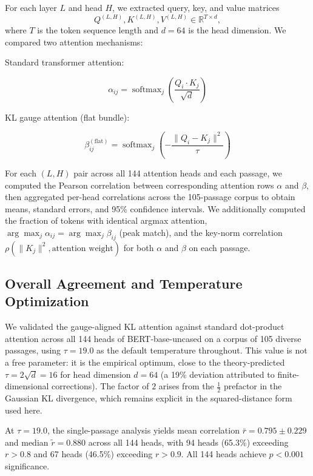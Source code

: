 \documentclass[twoside,11pt]{article}
\begin{document}
For each layer $L$ and head $H$, we extracted query, key, and value matrices
\[
Q^{(L,H)}, K^{(L,H)}, V^{(L,H)} \in \mathbb{R}^{T \times d},
\]
where $T$ is the token sequence length and $d = 64$ is the head dimension. We compared two attention mechanisms:

Standard transformer attention:

\begin{equation}
\alpha_{ij} = \operatorname{softmax}_j \left( \frac{Q_i \cdot K_j}{\sqrt{d}} \right)
\end{equation}

KL gauge attention (flat bundle):

\begin{equation}
\beta^{(\mathrm{flat})}_{ij} = \operatorname{softmax}_j \left( -\frac{\|Q_i - K_j\|^2}{\tau} \right)
\end{equation}

For each $(L,H)$ pair across all 144 attention heads and each passage, we computed the Pearson correlation between corresponding attention rows $\alpha$ and $\beta$, then aggregated per-head correlations across the 105-passage corpus to obtain means, standard errors, and 95\% confidence intervals. We additionally computed the fraction of tokens with identical argmax attention, $\arg\max_j \alpha_{ij} = \arg\max_j \beta_{ij}$ (peak match), and the key-norm correlation $\rho(\|K_j\|^2, \text{attention weight})$ for both $\alpha$ and $\beta$ on each passage.

\subsection{Overall Agreement and Temperature Optimization}

We validated the gauge-aligned KL attention against standard dot-product attention across all 144 heads of BERT-base-uncased on a corpus of 105 diverse passages, using $\tau = 19.0$ as the default temperature throughout. This value is not a free parameter: it is the empirical optimum, close to the theory-predicted $\tau = 2\sqrt{d} = 16$ for head dimension $d = 64$ (a 19\% deviation attributed to finite-dimensional corrections). The factor of $2$ arises from the $\frac{1}{2}$ prefactor in the Gaussian KL divergence, which remains explicit in the squared-distance form used here.

At $\tau = 19.0$, the single-passage analysis yields mean correlation $\bar{r} = 0.795 \pm 0.229$ and median $\tilde{r} = 0.880$ across all 144 heads, with 94 heads (65.3\%) exceeding $r > 0.8$ and 67 heads (46.5\%) exceeding $r > 0.9$. All 144 heads achieve $p < 0.001$ significance.
\end{document}
